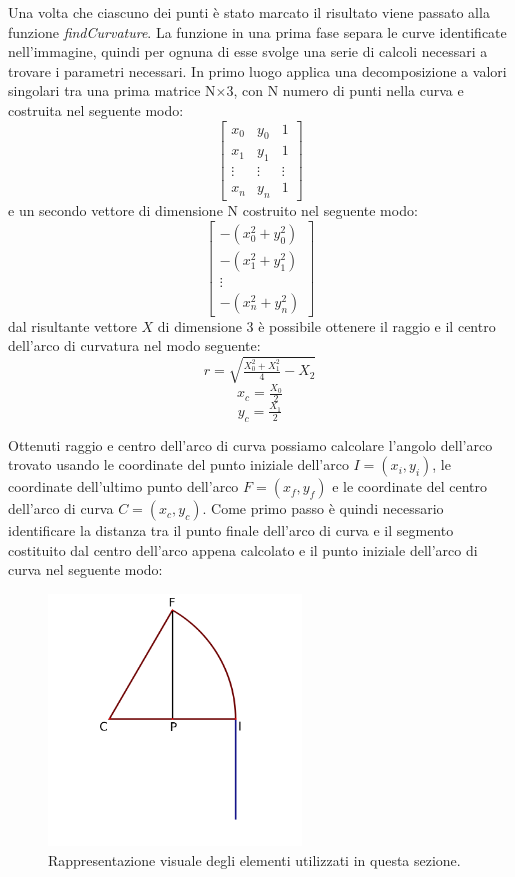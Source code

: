     Una volta che ciascuno dei punti è stato marcato il risultato viene passato alla funzione \textit{findCurvature}. La funzione in una prima fase separa le curve identificate nell'immagine, quindi per ognuna di esse svolge una serie di calcoli necessari a trovare i parametri necessari. In primo luogo applica una decomposizione a valori singolari tra una prima matrice N$\times$3, con N numero di punti nella curva e costruita nel seguente modo:\newline
    $$\begin{bmatrix}x_0 & y_0 & 1 \\ x_1 & y_1 & 1 \\ \vdots & \vdots & \vdots \\ x_n & y_n & 1 \end{bmatrix}$$ e un secondo vettore di dimensione N costruito nel seguente modo: \newline
    $$\begin{bmatrix}-(x_0^2+y_0^2) \\ -(x_1^2+y_1^2) \\ \vdots \\ -(x_n^2+y_n^2) \end{bmatrix}$$
    dal risultante vettore $X$ di dimensione 3 è possibile ottenere il raggio e il centro dell'arco di curvatura nel modo seguente: \newline
    $$ r = \sqrt{{\tfrac{X_0^2+X_1^2}{4}}-X_2}$$
    $$ x_c = \tfrac{X_0}{2} $$
    $$ y_c = \tfrac{X_1}{2} $$

    Ottenuti raggio e centro dell'arco di curva possiamo calcolare l'angolo dell'arco trovato usando le coordinate del punto iniziale dell'arco $I = (x_i, y_i)$, le coordinate dell'ultimo punto dell'arco $F = (x_f, y_f)$ e le coordinate del centro dell'arco di curva $C = (x_c, y_c)$. Come primo passo è quindi necessario identificare la distanza tra il punto finale dell'arco di curva e il segmento costituito dal centro dell'arco appena calcolato e il punto iniziale dell'arco di curva nel seguente modo:

    \begin{figure}[!ht]
        \centering
        \includegraphics[width=0.6\textwidth]{img/curveimg}
        \caption[Immagine della curva.]{Rappresentazione visuale degli elementi utilizzati in questa sezione.}
    \end{figure}

